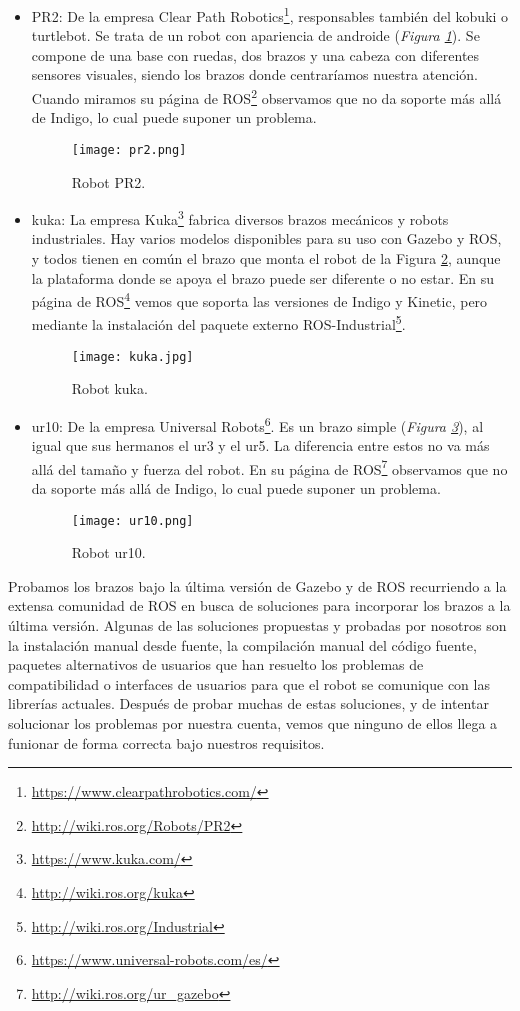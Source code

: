 \begin{itemize}
	\item PR2: De la empresa Clear Path Robotics\footnote{\url{https://www.clearpathrobotics.com/}}, responsables también del kobuki o turtlebot. Se trata de un robot con apariencia de androide (\textit{Figura \ref{fig:pr2}}). Se compone de una base con ruedas, dos brazos y una cabeza con diferentes sensores visuales, siendo los brazos donde centraríamos nuestra atención. Cuando miramos su página de ROS\footnote{\url{http://wiki.ros.org/Robots/PR2}} observamos que no da soporte más allá de Indigo, lo cual puede suponer un problema.
	\begin{figure}[h]
		\centering\texttt{[image: pr2.png]}
		\caption{Robot PR2.}
		\label{fig:pr2}
	\end{figure}
	\item kuka: La empresa Kuka\footnote{\url{https://www.kuka.com/}} fabrica diversos brazos mecánicos y robots industriales. Hay varios modelos disponibles para su uso con Gazebo y ROS, y todos tienen en común el brazo que monta el robot de la Figura \ref{fig:kuka}, aunque la plataforma donde se apoya el brazo puede ser diferente o no estar. En su página de ROS\footnote{\url{http://wiki.ros.org/kuka}} vemos que soporta las versiones de Indigo y Kinetic, pero mediante la instalación del paquete externo ROS-Industrial\footnote{\url{http://wiki.ros.org/Industrial}}.
	\begin{figure}[h]
		\centering\texttt{[image: kuka.jpg]}
		\caption{Robot kuka.}
		\label{fig:kuka}
	\end{figure}
	\item ur10: De la empresa Universal Robots\footnote{\url{https://www.universal-robots.com/es/}}. Es un brazo simple (\textit{Figura \ref{fig:ur10}}), al igual que sus hermanos el ur3 y el ur5. La diferencia entre estos no va más allá del tamaño y fuerza del robot. En su página de ROS\footnote{\url{http://wiki.ros.org/ur_gazebo}} observamos que no da soporte más allá de Indigo, lo cual puede suponer un problema.
	\begin{figure}[h]
		\centering\texttt{[image: ur10.png]}
		\caption{Robot ur10.}
		\label{fig:ur10}
	\end{figure}
\end{itemize}

Probamos los brazos bajo la última versión de Gazebo y de ROS recurriendo a la extensa comunidad de ROS en busca de soluciones para incorporar los brazos a la última versión. Algunas de las soluciones propuestas y probadas por nosotros son la instalación manual desde fuente, la compilación manual del código fuente, paquetes alternativos de usuarios que han resuelto los problemas de compatibilidad o interfaces de usuarios para que el robot se comunique con las librerías actuales. Después de probar muchas de estas soluciones, y de intentar solucionar los problemas por nuestra cuenta, vemos que ninguno de ellos llega a funionar de forma correcta bajo nuestros requisitos.

